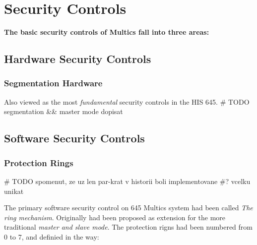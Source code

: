 










\section{Security Controls}

\textbf{The basic security controls of Multics fall into three areas:}

\subsection{Hardware Security Controls}

\subsubsection{Segmentation Hardware}

Also viewed as the most \textit{fundamental} security controls in the HIS 645.
# TODO segmentation && master mode dopisat

\subsection{Software Security Controls}

\subsubsection{Protection Rings} 
# TODO spomenut, ze uz len par-krat v historii boli implementovane
#? vcelku unikat

The primary software security control on 645 Multics system had been called \textit{The ring mechanism}.
Originally had been proposed as extension for the more traditional \textit{master and slave mode}.
The protection rigns had been numbered from 0 to 7, and definied in the way:

